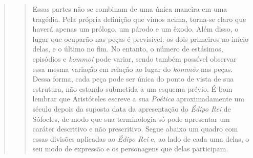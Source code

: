 \begin{verse}
\begin{verse}
Essas partes não se combinam de uma única maneira em uma tragédia. Pela
própria definição que vimos acima, torna-se claro que haverá apenas um
prólogo, um párodo e um êxodo. Além disso, o lugar que ocuparão nas
peças é previsível: os dois primeiros no início delas, e o último no
fim. No entanto, o número de estásimos, episódios e \emph{kommoí} pode
variar, sendo também possível observar essa mesma variação em relação ao
lugar do \emph{kommós} nas peças. Dessa forma, cada peça pode ser única
do ponto de vista de sua estrutura, não estando submetida a um esquema
prévio. É bom lembrar que Aristóteles escreve a sua \emph{Poética}
aproximadamente um século depois da suposta data da apresentação do
\emph{Édipo Rei} de Sófocles, de modo que sua terminologia só pode
apresentar um caráter descritivo e não prescritivo. Segue abaixo um
quadro com essas divisões aplicadas ao \emph{Édipo Rei} e, ao lado de
cada uma delas, o seu modo de expressão e os personagens que delas
participam.


\end{verse}
\end{verse}
